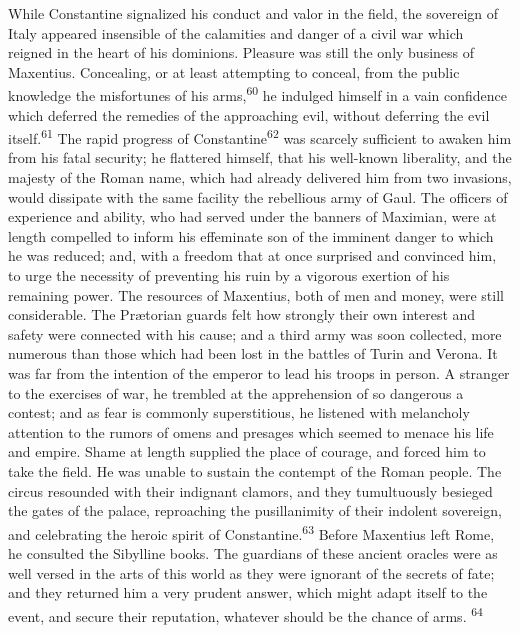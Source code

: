 While Constantine signalized his conduct and valor in the field,
the sovereign of Italy appeared insensible of the calamities and
danger of a civil war which reigned in the heart of his
dominions. Pleasure was still the only business of Maxentius.
Concealing, or at least attempting to conceal, from the public
knowledge the misfortunes of his arms,\textsuperscript{60} he indulged himself in
a vain confidence which deferred the remedies of the approaching
evil, without deferring the evil itself.\textsuperscript{61} The rapid progress of
Constantine\textsuperscript{62} was scarcely sufficient to awaken him from his
fatal security; he flattered himself, that his well-known
liberality, and the majesty of the Roman name, which had already
delivered him from two invasions, would dissipate with the same
facility the rebellious army of Gaul. The officers of experience
and ability, who had served under the banners of Maximian, were
at length compelled to inform his effeminate son of the imminent
danger to which he was reduced; and, with a freedom that at once
surprised and convinced him, to urge the necessity of preventing
his ruin by a vigorous exertion of his remaining power. The
resources of Maxentius, both of men and money, were still
considerable. The Prætorian guards felt how strongly their own
interest and safety were connected with his cause; and a third
army was soon collected, more numerous than those which had been
lost in the battles of Turin and Verona. It was far from the
intention of the emperor to lead his troops in person. A stranger
to the exercises of war, he trembled at the apprehension of so
dangerous a contest; and as fear is commonly superstitious, he
listened with melancholy attention to the rumors of omens and
presages which seemed to menace his life and empire. Shame at
length supplied the place of courage, and forced him to take the
field. He was unable to sustain the contempt of the Roman people.
The circus resounded with their indignant clamors, and they
tumultuously besieged the gates of the palace, reproaching the
pusillanimity of their indolent sovereign, and celebrating the
heroic spirit of Constantine.\textsuperscript{63} Before Maxentius left Rome, he
consulted the Sibylline books. The guardians of these ancient
oracles were as well versed in the arts of this world as they
were ignorant of the secrets of fate; and they returned him a
very prudent answer, which might adapt itself to the event, and
secure their reputation, whatever should be the chance of arms. \textsuperscript{64}


